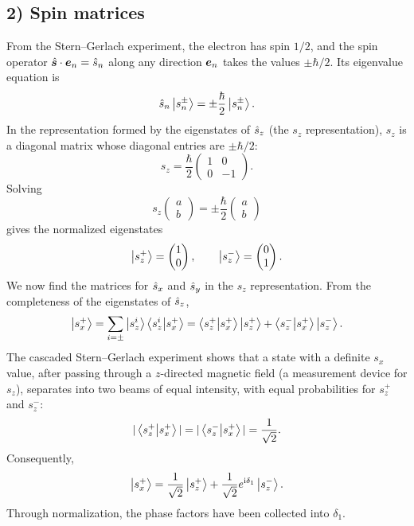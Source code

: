 \subsection*{2) Spin matrices}
From the Stern--Gerlach experiment, the electron has spin $1/2$, and the spin operator $\hat{\bm{s}}\cdot\bm{e}_n=\hat{s}_n$ along any direction $\bm{e}_n$ takes the values $\pm\hbar/2$. Its eigenvalue equation is
\begin{equation}
\hat{s}_n\left|s_n^\pm\right\rangle=\pm\frac\hbar2\left|s_n^\pm\right\rangle.
\end{equation}
In the representation formed by the eigenstates of $\hat{s}_z$ (the $s_z$ representation), $s_z$ is a diagonal matrix whose diagonal entries are $\pm\hbar/2$:
\begin{equation}
s_z=\frac\hbar2\begin{pmatrix}1&0\\0&-1\end{pmatrix}.
\end{equation}
Solving
\begin{equation}
s_z\begin{pmatrix}a\\b\end{pmatrix}=\pm\frac\hbar2\begin{pmatrix}a\\b\end{pmatrix}
\end{equation}
gives the normalized eigenstates
\begin{equation}
\left|s_z^+\right\rangle=\begin{pmatrix}1\\0\end{pmatrix},\qquad
\left|s_z^-\right\rangle=\begin{pmatrix}0\\1\end{pmatrix}.
\end{equation}
We now find the matrices for $\hat{s}_x$ and $\hat{s}_y$ in the $s_z$ representation. From the completeness of the eigenstates of $\hat{s}_z$,
\begin{equation}
\left|s_x^+\right\rangle=\sum_{i=\pm}\left|s_z^i\right\rangle\left\langle s_z^i\middle|s_x^+\right\rangle
=\left\langle s_z^+\middle|s_x^+\right\rangle\left|s_z^+\right\rangle
+\left\langle s_z^-\middle|s_x^+\right\rangle\left|s_z^-\right\rangle.
\end{equation}
The cascaded Stern--Gerlach experiment shows that a state with a definite $s_x$ value, after passing through a $z$-directed magnetic field (a measurement device for $s_z$), separates into two beams of equal intensity, with equal probabilities for $s_z^+$ and $s_z^-$:
\begin{equation}
|\left\langle s_z^+\middle|s_x^+\right\rangle|=|\left\langle s_z^-\middle|s_x^+\right\rangle|=\frac1{\sqrt2}.
\end{equation}
Consequently,
\begin{equation}
\left|s_x^+\right\rangle=\frac1{\sqrt2}\left|s_z^+\right\rangle+\frac1{\sqrt2}e^{\mathrm{i}\delta_1}\left|s_z^-\right\rangle.
\end{equation}
Through normalization, the phase factors have been collected into $\delta_1$.

